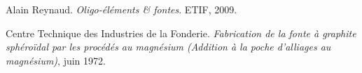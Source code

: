 \documentclass[12pt]{article}
\begin{document}
\begin{thebibliography}{9}


Alain Reynaud. \emph{Oligo-éléments \& fontes}. ETIF, 2009.


Centre Technique des Industries de la Fonderie. \emph{Fabrication de la fonte à graphite sphéroïdal par les procédés au magnésium (Addition à la poche d'alliages au magnésium)}, juin 1972.


\end{thebibliography}
\end{document}
